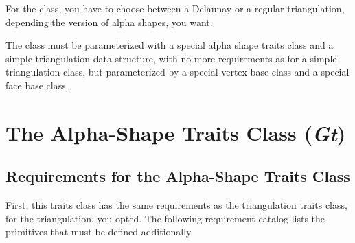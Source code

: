 For the  class, you have to choose between a Delaunay or a regular
triangulation, depending the version of alpha shapes, you want.

The class  must be parameterized with a special alpha shape
traits class and a simple triangulation data structure, with no more requirements as
for a simple triangulation class, but parameterized by a special vertex base
class and a special face base class.

\section*{The Alpha-Shape Traits Class (\mbox{\it Gt})\label{I1_ASTraits}} 

\subsection{Requirements for the Alpha-Shape Traits Class}

First, this traits class has the same requirements as the 
triangulation traits class, for the  triangulation, you opted.
The following requirement catalog lists the primitives that must be defined
additionally.


